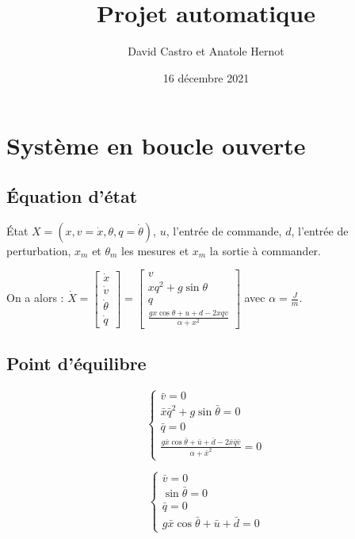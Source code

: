 \documentclass[10pt]{article}
\title{Projet automatique}
\author{David Castro et Anatole Hernot}
\date{16 décembre 2021}
\begin{document}
\maketitle
\theoremstyle{definition}

\newcommand{\inv}[1]{\frac{1}{#1}}

\section{Système en boucle ouverte}

\subsection*{Équation d'état}

État $X = (x, v = \dot x, \theta, q = \dot{\theta})$, $u$, l'entrée de commande, $d$, l'entrée de perturbation, $x_m$ et $\theta_m$ les mesures et $x_m$ la sortie à commander.

\vspace{10px}

\noindent On a alors :  $\dot X = \begin{bmatrix} \dot x \\ \dot v \\ \dot \theta \\ \dot q \end{bmatrix} =
\begin{bmatrix} v \\ x q^2 + g \sin \theta \\ q \\ \frac{gx \cos \theta + u + d - 2xqv}{\alpha + x^2} \end{bmatrix}$
avec $\alpha = \frac{J}{m}$.

\subsection*{Point d'équilibre}

\[ \begin{cases} \bar v = 0 \\ \bar x \bar q^2 + g \sin \bar{\theta}  = 0 \\ \bar q = 0 \\ \frac{g \bar x \cos \bar{\theta} + \bar u + \bar d - 2 \bar x \bar q \bar v}{\alpha + \bar x^2} = 0 \end{cases} \]

\[ \begin{cases} \bar v = 0 \\ \sin \bar{\theta}  = 0 \\ \bar q = 0 \\ g \bar x \cos \bar{\theta} + \bar u + \bar d = 0 \end{cases} \]
\end{document}
